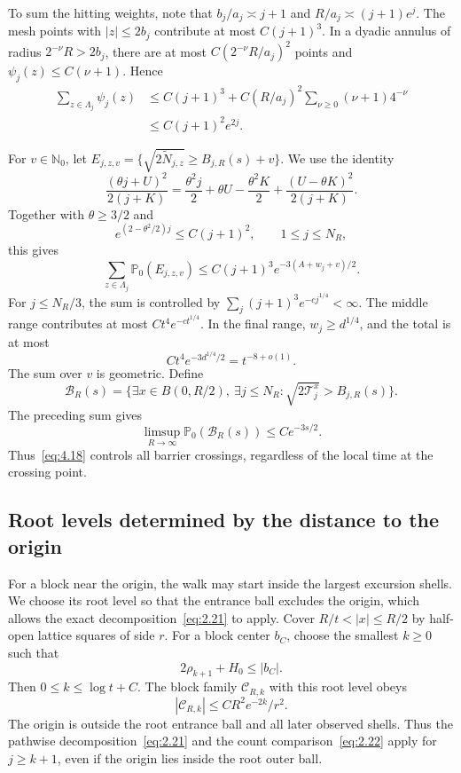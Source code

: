 \documentclass[11pt,a4paper]{article}
\numberwithin{equation}{section}
\theoremstyle{remark}
\begin{document}
To sum the hitting weights, note that $b_j/a_j\asymp j+1$ and
$R/a_j\asymp(j+1)e^j$. The mesh points with $|z|\le2b_j$ contribute at most $C(j+1)^3$. In a dyadic annulus of radius $2^{-\nu}R>2b_j$, there are at most $C(2^{-\nu}R/a_j)^2$ points and $\psi_j(z)\le C(\nu+1)$. Hence
\begin{equation}\label{eq:4.15}
\begin{aligned}
\sum_{z\in\Lambda_j}\psi_j(z)
&\le C(j+1)^3+C(R/a_j)^2\sum_{\nu\ge0}(\nu+1)4^{-\nu}\\
&\le C(j+1)^2e^{2j}.
\end{aligned}
\end{equation}

For $v\in\mathbb N_0$, let
$E_{j,z,v}=\{\sqrt{2\widetilde N_{j,z}}\ge B_{j,R}(s)+v\}$.
We use the identity
\begin{equation}\label{eq:4.16}
\frac{(\theta j+U)^2}{2(j+K)}
=\frac{\theta^2j}{2}+\theta U-\frac{\theta^2K}{2}
+\frac{(U-\theta K)^2}{2(j+K)}.
\end{equation}
Together with $\theta\ge3/2$ and
\[
e^{(2-\theta^2/2)j}\le C(j+1)^2,\qquad 1\le j\le N_R,
\]
this gives
\begin{equation}\label{eq:4.17}
\sum_{z\in\Lambda_j}\mathbb P_0(E_{j,z,v})
\le C(j+1)^3e^{-3(A+w_j+v)/2}.
\end{equation}
For $j\le N_R/3$, the sum is controlled by $\sum_j(j+1)^3e^{-cj^{1/4}}<\infty$. The middle range contributes at most $Ct^4e^{-ct^{1/4}}$. In the final range, $w_j\ge d^{1/4}$, and the total is at most
\[
Ct^4e^{-3d^{1/4}/2}=t^{-8+o(1)}.
\]
The sum over $v$ is geometric. Define
\[
\mathcal B_R(s)=\{\exists x\in B(0,R/2),\ \exists j\le N_R:
\sqrt{2\mathcal T_j^x}>B_{j,R}(s)\}.
\]
The preceding sum gives
\begin{equation}\label{eq:4.18}
\limsup_{R\to\infty}\mathbb P_0(\mathcal B_R(s))\le Ce^{-3s/2}.
\end{equation}
Thus~\eqref{eq:4.18} controls all barrier crossings, regardless of the local time at the crossing point.

\subsection{Root levels determined by the distance to the origin}\label{sec:rootlevels}
For a block near the origin, the walk may start inside the largest excursion shells. We choose its root level so that the entrance ball excludes the origin, which allows the exact decomposition~\eqref{eq:2.21} to apply. Cover $R/t<|x|\le R/2$ by half-open lattice squares of side $r$. For a block center $b_C$, choose the smallest $k\ge0$ such that
\begin{equation}\label{eq:4.19}
2\rho_{k+1}+H_0\le|b_C|.
\end{equation}
Then $0\le k\le\log t+C$. The block family $\mathscr C_{R,k}$ with this root level obeys
\begin{equation}\label{eq:4.20}
|\mathscr C_{R,k}|\le C R^2e^{-2k}/r^2.
\end{equation}
The origin is outside the root entrance ball and all later observed shells. Thus the pathwise decomposition~\eqref{eq:2.21} and the count comparison~\eqref{eq:2.22} apply for $j\ge k+1$, even if the origin lies inside the root outer ball.
\end{document}
